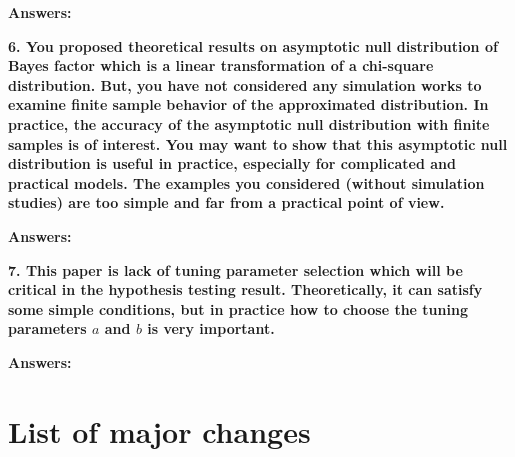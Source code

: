 \documentclass[11pt]{article}
\theoremstyle{plain}
\theoremstyle{definition}
\theoremstyle{remark}
\begin{document}
\textbf{Answers:}



\textbf{
    6. You proposed theoretical results on asymptotic null distribution of Bayes factor which is a linear transformation of a chi-square distribution.
    But, you have not considered any simulation works to examine finite sample behavior of the approximated distribution.
    In practice, the accuracy of the asymptotic null distribution with finite samples is of interest.
    You may want to show that this asymptotic null distribution is useful in practice, especially for complicated and practical models.
    The examples you considered (without simulation studies) are too simple and far from a practical point of view.
}

\textbf{Answers:}


\textbf{
    7. This paper is lack of tuning parameter selection which will be critical in the hypothesis testing result.
    Theoretically, it can satisfy some simple conditions, but in practice how to choose the tuning parameters $a$ and $b$ is very important.
}

\textbf{Answers:}




\section{List of major changes}






\end{document}

